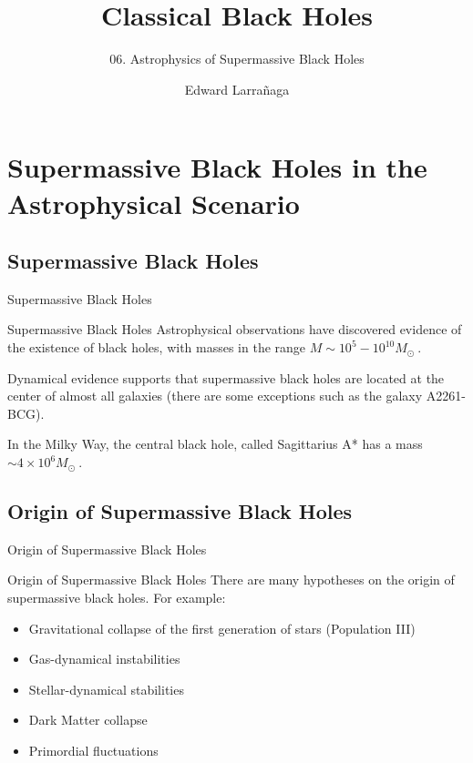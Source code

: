 \documentclass{beamer}
\title{Classical Black Holes} %
\subtitle{06. Astrophysics of Supermassive Black Holes} %
\author{Edward Larra\~{n}aga}
\begin{document}
\frame{\maketitle}


\section{Supermassive Black Holes in the Astrophysical Scenario}

\subsection{Supermassive Black Holes}
\begin{frame}
	\huge
    Supermassive Black Holes
\end{frame}

\begin{frame}{Supermassive Black Holes}
	Astrophysical observations have discovered evidence of the existence of black holes, with masses in the range $M \sim 10^5 - 10^{10} M_\odot\ $.\\
	\bigskip
	\pause

	Dynamical evidence supports that supermassive black holes are located at the center of almost all galaxies (there are some exceptions such as the galaxy A2261-BCG).
	\bigskip
	\pause
	
	In the Milky Way, the central black hole, called Sagittarius A* has a mass $\sim 4 \times 10^6 M_\odot\ $.
\end{frame}

\subsection{Origin of Supermassive Black Holes}
\begin{frame}
\Huge
Origin of Supermassive Black Holes
\end{frame}

\begin{frame}{Origin of Supermassive Black Holes}
	There are many hypotheses on the origin of supermassive black holes. For example:
	\begin{itemize}
    \item<2-> Gravitational collapse of the first generation of stars (Population III)
    \item<3-> Gas-dynamical instabilities
	\item<4-> Stellar-dynamical stabilities
	\item<5-> Dark Matter collapse
	\item<6-> Primordial fluctuations
    \end{itemize}
\end{frame}
\end{document}
